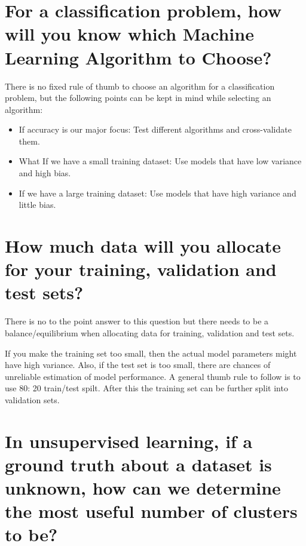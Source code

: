 \documentclass[
]{book}
\begin{document}
\hypertarget{for-a-classification-problem-how-will-you-know-which-machine-learning-algorithm-to-choose}{%
\section{For a classification problem, how will you know which Machine Learning Algorithm to Choose?}\label{for-a-classification-problem-how-will-you-know-which-machine-learning-algorithm-to-choose}}

There is no fixed rule of thumb to choose an algorithm for a classification problem, but the following points can be kept in mind while selecting an algorithm:

\begin{itemize}
\item
  If accuracy is our major focus: Test different algorithms and cross-validate them.
\item
  What If we have a small training dataset: Use models that have low variance and high bias.
\item
  If we have a large training dataset: Use models that have high variance and little bias.
\end{itemize}

\hypertarget{how-much-data-will-you-allocate-for-your-training-validation-and-test-sets}{%
\section{How much data will you allocate for your training, validation and test sets?}\label{how-much-data-will-you-allocate-for-your-training-validation-and-test-sets}}

There is no to the point answer to this question but there needs to be a balance/equilibrium when allocating data for training, validation and test sets.

If you make the training set too small, then the actual model parameters might have high variance. Also, if the test set is too small, there are chances of unreliable estimation of model performance. A general thumb rule to follow is to use 80: 20 train/test spilt. After this the training set can be further split into validation sets.

\hypertarget{in-unsupervised-learning-if-a-ground-truth-about-a-dataset-is-unknown-how-can-we-determine-the-most-useful-number-of-clusters-to-be}{%
\section{In unsupervised learning, if a ground truth about a dataset is unknown, how can we determine the most useful number of clusters to be?}\label{in-unsupervised-learning-if-a-ground-truth-about-a-dataset-is-unknown-how-can-we-determine-the-most-useful-number-of-clusters-to-be}}
\end{document}
